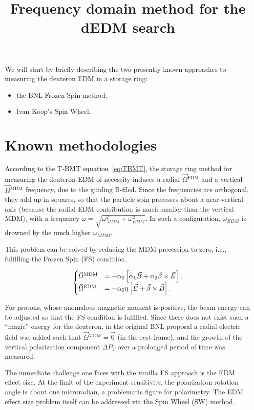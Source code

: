 \documentclass{article}
\newcommand{\W}{\Omega}
\newcommand{\w}{\omega}
\newcommand{\MDM}{{}^\mathrm{MDM}}
\newcommand{\EDM}{{}^\mathrm{EDM}}
\begin{document}
\title{Frequency domain method for the dEDM search}
We will start by briefly describing the two presently known approaches to measuring the deuteron EDM in a storage ring:
\begin{itemize}
\item the BNL Frozen Spin method;
\item Ivan Koop's Spin Wheel.
\end{itemize}

\section{Known methodologies}
According to the T-BMT equation~\eqref{eq:TBMT}, the storage ring method for measuring the deuteron EDM of necessity induces a radial $\vec\W\EDM$ and a vertical $\vec\W\MDM$ frequency, due to the guiding B-filed. Since the frequencies are orthogonal, they add up in squares, so that the particle spin precesses about a near-vertical axis (because the radial EDM contribution is much smaller than the vertical MDM), with a frequency $\w  = \sqrt{\w_{MDM}^2 + \w_{EDM}^2}$. In such a configuration, $\w_{EDM}$ is drowned by the much higher $\w_{MDM}$.

This problem can be solved by reducing the MDM precession to zero, i.e., fulfilling the Frozen Spin (FS) condition.

\begin{equation}\label{eq:TBMT}
  \begin{cases}
    \vec\W\MDM &= -\alpha_0\bkt*{\alpha_1\vec B + \alpha_2\vec\beta\times\vec E}, \\
    \vec\W\EDM &= -\alpha_0\eta\bkt*{\vec E + \vec\beta\times\vec B}.
  \end{cases}
\end{equation}

For protons, whose anomalous magnetic moment is positive, the beam energy can be adjusted so that the FS condition is fulfilled. Since there does not exist such a ``magic'' energy for the deuteron, in the original BNL proposal a radial electric field was added such that $\vec\W\MDM = \vec 0$ (in the rest frame), and the growth of the vertical polarization component $\Delta P_V$ over a prolonged period of time was measured.~\cite{BNL_proposal}

The immediate challenge one faces with the vanilla FS approach is the EDM effect size. At the limit of the experiment sensitivity, the polarization rotation angle is about one microradian, a problematic figure for polarimetry. The EDM effect size problem itself can be addressed via the Spin Wheel (SW) method.~\cite{Mane:SpinWheel}
\end{document}
